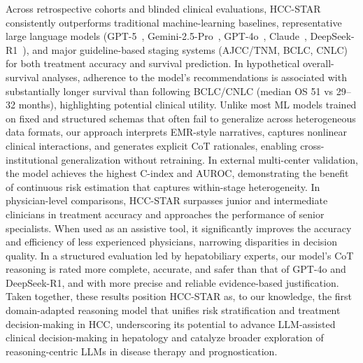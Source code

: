\documentclass{article}
\begin{document}
Across retrospective cohorts and blinded clinical evaluations, HCC-STAR consistently outperforms traditional machine-learning baselines, representative large language models (GPT-5~\cite{openai_gpt5_2025}, Gemini-2.5-Pro~\cite{google_gemini25_2025}, GPT-4o~\cite{openai_gpt4o_syscard}, Claude~\cite{anthropic_claude35_2024}, DeepSeek-R1~\cite{deepseek_r1_2025}), and major guideline-based staging systems (AJCC/TNM, BCLC, CNLC) for both treatment accuracy and survival prediction. In hypothetical overall-survival analyses, adherence to the model’s recommendations is associated with substantially longer survival than following BCLC/CNLC (median OS 51 vs 29–32 months), highlighting potential clinical utility. Unlike most ML models trained on fixed and structured schemas that often fail to generalize across heterogeneous data formats, our approach interprets EMR-style narratives, captures nonlinear clinical interactions, and generates explicit CoT rationales, enabling cross-institutional generalization without retraining. In external multi-center validation, the model achieves the highest C-index and AUROC, demonstrating the benefit of continuous risk estimation that captures within-stage heterogeneity. In physician-level comparisons, HCC-STAR surpasses junior and intermediate clinicians in treatment accuracy and approaches the performance of senior specialists. When used as an assistive tool, it significantly improves the accuracy and efficiency of less experienced physicians, narrowing disparities in decision quality. In a structured evaluation led by hepatobiliary experts, our model's CoT reasoning is rated more complete, accurate, and safer than that of GPT-4o and DeepSeek-R1, and with more precise and reliable evidence-based justification. Taken together, these results position HCC-STAR as, to our knowledge, the first domain-adapted reasoning model that unifies risk stratification and treatment decision-making in HCC, underscoring its potential to advance LLM-assisted clinical decision-making in hepatology and catalyze broader exploration of reasoning-centric LLMs in disease therapy and prognostication.
\end{document}
